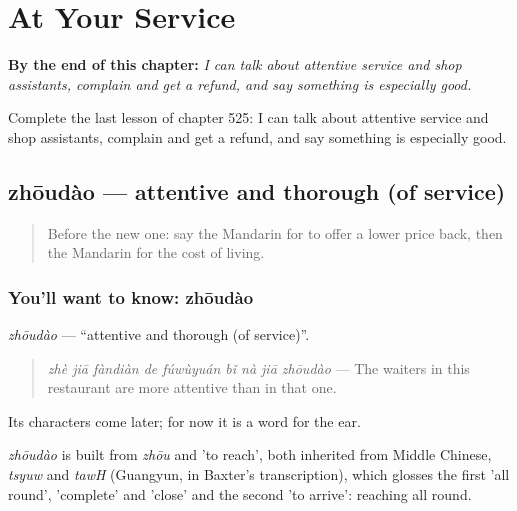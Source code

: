 
\chapter{At Your Service}
\label{ch:zh-at-your-service}

\begin{chapteropening}
\textbf{By the end of this chapter:} \emph{I can talk about attentive service and shop assistants, complain and get a refund, and say something is especially good.}

Complete the last lesson of chapter 525: I can talk about attentive service and shop assistants, complain and get a refund, and say something is especially good.
\end{chapteropening}

\section[zhōudào]{zhōudào — attentive and thorough (of service)}

\label{lesson:ZH-C525-zhoudao}



\begin{quote}
Before the new one: say the Mandarin for to offer a lower price back, then the Mandarin for the cost of living.
\end{quote}

\subsection*{You'll want to know: zhōudào}
\emph{zhōudào} — \textquotedblleft{}attentive and thorough (of service)\textquotedblright{}.

\begin{quote}
\emph{zhè jiā fàndiàn de fúwùyuán bǐ nà jiā zhōudào} — The waiters in this restaurant are more attentive than in that one.
\end{quote}

Its characters come later; for now it is a word for the ear.

\begin{cousinweb}
\emph{zhōudào} is built from \emph{zhōu} and  'to reach', both inherited from Middle Chinese, \emph{tsyuw} and \emph{tawH} (Guangyun, in Baxter's transcription), which glosses the first 'all round', 'complete' and 'close' and the second 'to arrive': reaching all round.
\end{cousinweb}


